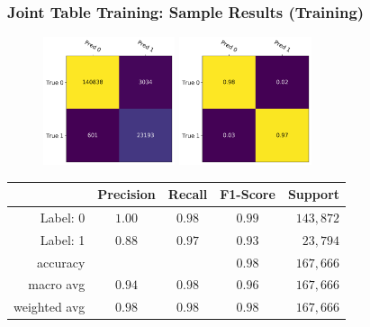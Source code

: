 \documentclass[usenames,dvipsnames]{beamer}
\begin{document}
\begin{frame}
  \frametitle{Joint Table Training: Sample Results (Training)}
  \begin{figure}
    \centering
    \includegraphics[height=3.75cm, valign=c]{assets/joint_cm_table_train}
    \includegraphics[height=3.75cm, valign=c]{assets/joint_cm_table_norm_train}
  \end{figure}
  \begin{center}
    \begin{tabular}{rcccr}
    \toprule
    {} &  Precision &  Recall &  F1-Score & Support \\
    \midrule
    Label: 0 & $1.00$ & $0.98$ & $0.99$ & $143,872$ \\
    Label: 1 & $0.88$ & $0.97$ & $0.93$ & $23,794$ \\
    \midrule
    accuracy & {} & {} & $0.98$ & $167,666$ \\
    macro avg & $0.94$ & $0.98$ & $0.96$ & $167,666$ \\
    weighted avg & $0.98$ & $0.98$ & $0.98$ & $167,666$ \\
    \bottomrule
    \end{tabular}
  \end{center}
\end{frame}
\end{document}
